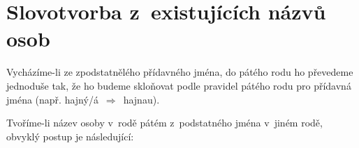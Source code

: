 %
%
%

\section{Slovotvorba z existujících názvů osob}

Vycházíme-li ze zpodstatnělého přídavného jména,
do pátého rodu ho převedeme jednoduše tak, že ho budeme skloňovat podle pravidel
pátého rodu pro přídavná jména (např. hajný/á~$\Rightarrow$~hajnau).

Tvoříme-li název osoby v rodě pátém z podstatného jména v jiném rodě,
obvyklý postup je následující:

